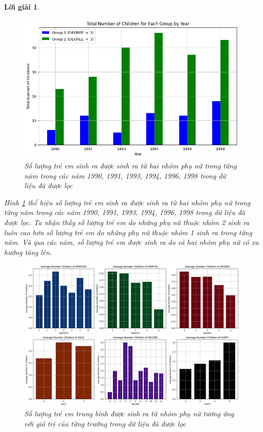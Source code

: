 \documentclass[14pt, a4paper]{article}
\theoremstyle{sltheorem}
\theoremstyle{soltheorem}
\newtheorem*{loigiai}{Lời giải}
\begin{document}
\begin{loigiai}
    \begin{figure}[H]
        \centering
        \includegraphics[width=0.8\linewidth]{figures/considered_total_child_each_women_group_each_year.png}
        \caption{Số lượng trẻ em sinh ra được sinh ra từ hai nhóm phụ nữ trong từng năm trong các năm 1990, 1991, 1993, 1994, 1996, 1998 trong dữ liệu đã được lọc}
        \label{fig:considered_total_child_each_women_group_each_year}
    \end{figure}

    Hình \ref{fig:considered_total_child_each_women_group_each_year} thể hiện số lượng trẻ em sinh ra được sinh ra từ hai nhóm phụ nữ trong từng năm trong các năm 1990, 1991, 1993, 1994, 1996, 1998 trong dữ liệu đã được lọc.
    Ta nhận thấy số lượng trẻ em do những phụ nữ thuộc nhóm 2 sinh ra luôn cao hơn số lượng trẻ em do những phụ nữ thuộc nhóm 1 sinh ra trong từng năm.
    Và qua các năm, số lượng trẻ em được sinh ra do cả hai nhóm phụ nữ có xu hướng tăng lên.

    \begin{figure}[H]
        \centering
        \includegraphics[width=0.8\linewidth]{figures/considered_avg_child_field.png}
        \caption{Số lượng trẻ em trung bình được sinh ra từ nhóm phụ nữ tương ứng với giá trị của từng trường trong dữ liệu đã được lọc}
        \label{fig:considered_avg_child_field}
    \end{figure}


\end{loigiai}
\end{document}
